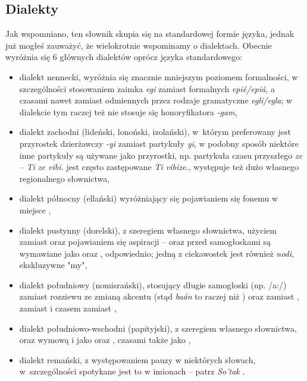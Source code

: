 \begin{spacing}{1.1}
\subsection{Dialekty}
Jak wspomniano, ten słownik skupia się na standardowej formie języka, jednak już
mogłeś zauważyć, że wielokrotnie wspominamy o dialektach. Obecnie wyróżnia się 6
głównych dialektów oprócz języka standardowego:

\begin{itemize}
    \item dialekt nennecki, wyróżnia się znacznie mniejszym poziomem
    formalności, w szczególności stosowaniem zaimka \emph{egi} zamiast
    formalnych \emph{epié/epiá}, a czasami nawet zamiast odmiennych przez
    rodzaje gramatyczne \emph{egli/egla}; w dialekcie tym raczej też nie stosuje
    się honoryfikatora \emph{-gam},
    \item dialekt zachodni (lideński, lonoński, izolański), w~którym preferowany
    jest przyrostek dzierżawczy \emph{-yi} zamiast partykuły \emph{yi}, w
    podobny sposób niektóre inne partykuły są używane jako przyrostki, np.
    partykuła czasu przyszłego \emph{ze} -- \emph{Ti ze vibi.} jest często
    zastępowane \emph{Ti vibize.}, występuje też dużo własnego regionalnego
    słownictwa,
    \item dialekt północny (ellański) wyróżniający się pojawianiem się fonemu
     w miejsce ,
    \item dialekt pustynny (dorelski), z szeregiem własnego słownictwa, użyciem
     zamiast  oraz pojawianiem się aspiracji --  oraz 
    przed samogłoskami są wymawiane jako  oraz , odpowiednio;
    jedną z ciekawostek jest również \emph{nodi}, ekskluzywne "my",
    \item dialekt południowy (nomisrański), stosujący długie samogłoski (np.
    /a:/) zamiast rozziewu ze zmianą akcentu (stąd \emph{baán} to raczej
     niż ) oraz  zamiast ,  zamiast 
    i czasem  zamiast ,
    \item dialekt południowo-wschodni (papityjski), z szeregiem własnego
    słownictwa, oraz wymową  i  jako  oraz , czasami
    także  jako ,
	\item dialekt remański, z występowaniem pauzy \xt{|} w niektórych słowach,
	w~szczególności spotykane jest to w imionach -- patrz \emph{So'tak}
	.
\end{itemize}


\end{spacing}
